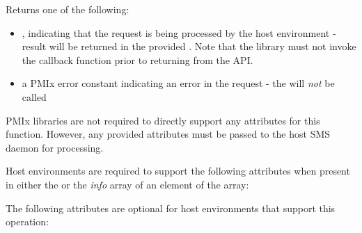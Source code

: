 \begin{arglist}
\end{arglist}

Returns one of the following:

\begin{itemize}
    \item {}, indicating that the request is being processed by the host environment - result will be returned in the provided . Note that the library must not invoke the callback function prior to returning from the \ac{API}.
    \item a PMIx error constant indicating an error in the request - the  will \textit{not} be called
\end{itemize}


\reqattrstart
\ac{PMIx} libraries are not required to directly support any attributes for this function. However, any provided attributes must be passed to the host \ac{SMS} daemon for processing.

\divider

Host environments are required to support the following attributes when present in either the  or the \textit{info} array of an element of the  array:


\reqattrend

\optattrstart
The following attributes are optional for host environments that support this operation:

